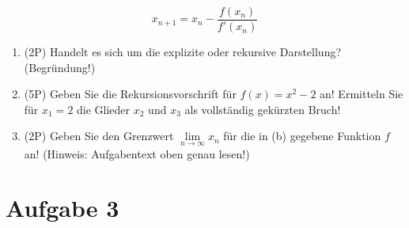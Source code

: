 \documentclass[12pt]{article}
\begin{document}
$$x_{n+1} = x_n - \frac{f(x_n)}{f'(x_n)}$$

\begin{enumerate}[label=(\alph*)]

\item (2P) Handelt es sich um die explizite oder rekursive Darstellung? (Begründung!)

\bigskip
\bigskip
\bigskip
\bigskip
\bigskip
\bigskip
\bigskip

\item (5P) Geben Sie die Rekursionsvorschrift für $f(x)=x^2-2$ an! Ermitteln Sie für $x_1=2$ die Glieder $x_2$ und $x_3$ als vollständig gekürzten Bruch!

\bigskip
\bigskip
\bigskip
\bigskip
\bigskip
\bigskip
\bigskip

\item (2P) Geben Sie den Grenzwert $\lim\limits_{n\to\infty}x_n$ für die in (b) gegebene Funktion $f$ an! (Hinweis: Aufgabentext oben genau lesen!)

\end{enumerate}

\newpage
\section* {Aufgabe 3}
\end{document}
